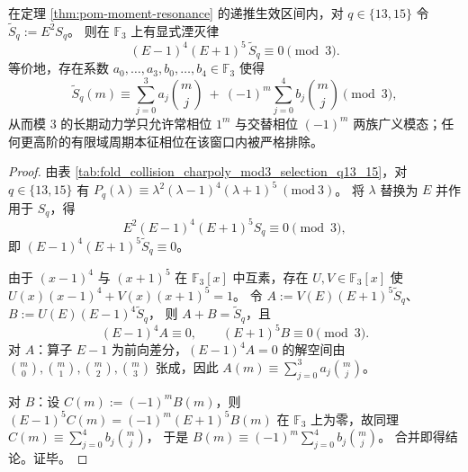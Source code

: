 \begin{proposition}[模 \texorpdfstring{$3$}{3} 的两相压缩：\texorpdfstring{$q=13,15$}{q=13,15} 只剩 \texorpdfstring{$1$}{1} 与 \texorpdfstring{$-1$}{-1} 两类广义相位]\label{prop:pom-moment-mod3-two-phase}
在定理 \ref{thm:pom-moment-resonance} 的递推生效区间内，对 \(q\in\{13,15\}\) 令
\(
\widetilde S_q:=E^2S_q
\)。
则在 \(\mathbb{F}_3\) 上有显式湮灭律
\[
(E-1)^4(E+1)^5\,\widetilde S_q\equiv 0\pmod 3.
\]
等价地，存在系数 \(a_0,\dots,a_3,b_0,\dots,b_4\in\mathbb{F}_3\) 使得
\[
\widetilde S_q(m)\equiv
\sum_{j=0}^{3}a_j\binom{m}{j}
\ +\ 
(-1)^m\sum_{j=0}^{4}b_j\binom{m}{j}
\pmod 3,
\]
从而模 \(3\) 的长期动力学只允许常相位 \(1^m\) 与交替相位 \((-1)^m\) 两族广义模态；任何更高阶的有限域周期本征相位在该窗口内被严格排除。
\end{proposition}
\begin{proof}
由表 \ref{tab:fold_collision_charpoly_mod3_selection_q13_15}，对 \(q\in\{13,15\}\) 有
\(
P_q(\lambda)\equiv \lambda^2(\lambda-1)^4(\lambda+1)^5\ (\mathrm{mod}\ 3)
\)。
将 \(\lambda\) 替换为 \(E\) 并作用于 \(S_q\)，得
\[
E^2(E-1)^4(E+1)^5S_q\equiv 0\pmod 3,
\]
即 \((E-1)^4(E+1)^5\widetilde S_q\equiv 0\)。
\par
由于 \((x-1)^4\) 与 \((x+1)^5\) 在 \(\mathbb{F}_3[x]\) 中互素，存在 \(U,V\in\mathbb{F}_3[x]\) 使
\(
U(x)(x-1)^4+V(x)(x+1)^5=1
\)。
令
\(
A:=V(E)(E+1)^5\widetilde S_q
\)、
\(
B:=U(E)(E-1)^4\widetilde S_q
\)，
则 \(A+B=\widetilde S_q\)，且
\[
(E-1)^4A\equiv 0,\qquad (E+1)^5B\equiv 0\pmod 3.
\]
对 \(A\)：算子 \(E-1\) 为前向差分，\((E-1)^4A=0\) 的解空间由
\(
\binom{m}{0},\binom{m}{1},\binom{m}{2},\binom{m}{3}
\)
张成，因此 \(A(m)\equiv \sum_{j=0}^3 a_j\binom{m}{j}\)。
\par
对 \(B\)：设 \(C(m):=(-1)^mB(m)\)，则
\(
(E-1)^5C(m)=(-1)^m(E+1)^5B(m)
\)
在 \(\mathbb{F}_3\) 上为零，故同理
\(
C(m)\equiv \sum_{j=0}^4 b_j\binom{m}{j}
\)，
于是 \(B(m)\equiv (-1)^m\sum_{j=0}^4 b_j\binom{m}{j}\)。
合并即得结论。证毕。
\end{proof}

